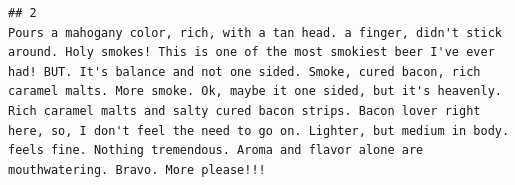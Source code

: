 \documentclass[
  a4paper,
]{article}
\begin{document}
\begin{verbatim}
## 2                                                                                                                                                                                                                                                                                                                                                                                                                                                                                                                                                                                                                                                                                                                                                                                                                                                                                                                                                                                                                                                                                                                                                                                                                                                                                                                                                                                                                                                                                                                                                                                                                         Pours a mahogany color, rich, with a tan head. a finger, didn't stick around. Holy smokes! This is one of the most smokiest beer I've ever had! BUT. It's balance and not one sided. Smoke, cured bacon, rich caramel malts. More smoke. Ok, maybe it one sided, but it's heavenly. Rich caramel malts and salty cured bacon strips. Bacon lover right here, so, I don't feel the need to go on. Lighter, but medium in body. feels fine. Nothing tremendous. Aroma and flavor alone are mouthwatering. Bravo. More please!!!

\end{verbatim}
\end{document}
